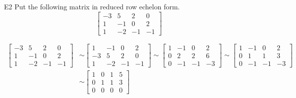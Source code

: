 \begin{problem}{E2}
Put the following matrix in reduced row echelon form.
$$\begin{bmatrix}-3 & 5 & 2 & 0 \\ 1 & -1 & 0 & 2 \\ 1 & -2 & -1 & -1 \end{bmatrix}$$
\end{problem}
\begin{solution}
\begin{align*}
\begin{bmatrix}
-3 & 5 & 2 & 0 \\
 1 & -1 & 0 & 2 \\
 1 & -2 & -1 & -1 
\end{bmatrix} &\sim
\begin{bmatrix}
 1 & -1 & 0 & 2 \\
-3 & 5 & 2 & 0 \\
 1 & -2 & -1 & -1 
\end{bmatrix} \sim
\begin{bmatrix}
 1 & -1 & 0 & 2 \\
 0 & 2 & 2 & 6 \\
 0 & -1 & -1 & -3 
\end{bmatrix} \sim
\begin{bmatrix}
 1 & -1 & 0 & 2 \\
 0 & 1 & 1 & 3 \\
 0 & -1 & -1 & -3 
\end{bmatrix} \\ &\sim
\begin{bmatrix}
 1 & 0 & 1 & 5 \\
 0 & 1 & 1 & 3 \\
 0 & 0 & 0 & 0 
\end{bmatrix} 
\end{align*}
\end{solution}

